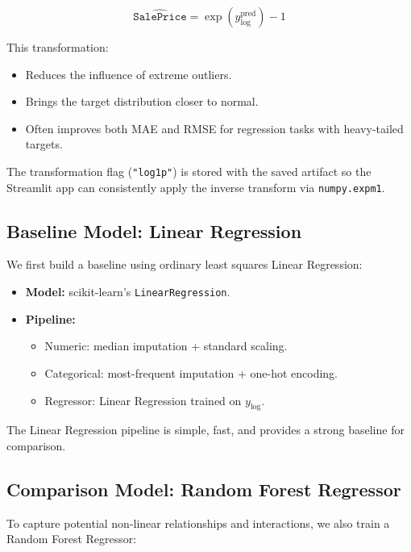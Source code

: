 \documentclass[11pt,a4paper]{article}
\begin{document}
\[
\widehat{\texttt{SalePrice}} = \exp(y_{\log}^{\text{pred}}) - 1
\]

This transformation:

\begin{itemize}[leftmargin=*]
    \item Reduces the influence of extreme outliers.
    \item Brings the target distribution closer to normal.
    \item Often improves both MAE and RMSE for regression tasks with heavy-tailed targets.
\end{itemize}

The transformation flag (\texttt{"log1p"}) is stored with the saved artifact so the Streamlit app can consistently apply the inverse transform via \texttt{numpy.expm1}.

\subsection{Baseline Model: Linear Regression}

We first build a baseline using ordinary least squares Linear Regression:

\begin{itemize}[leftmargin=*]
    \item \textbf{Model:} scikit-learn's \texttt{LinearRegression}.
    \item \textbf{Pipeline:}
    \begin{itemize}
        \item Numeric: median imputation + standard scaling.
        \item Categorical: most-frequent imputation + one-hot encoding.
        \item Regressor: Linear Regression trained on \(y_{\log}\).
    \end{itemize}
\end{itemize}

The Linear Regression pipeline is simple, fast, and provides a strong baseline for comparison.

\subsection{Comparison Model: Random Forest Regressor}

To capture potential non-linear relationships and interactions, we also train a Random Forest Regressor:
\end{document}
